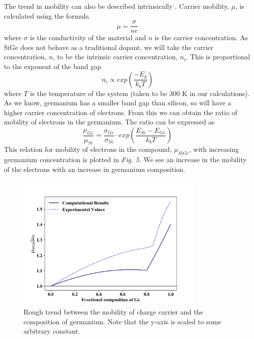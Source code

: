 \documentclass[10pt, twocolumn]{revtex4}    %
\begin{document}
The trend in mobility can also be described intrinsically \cite{ref01}. Carrier mobility, $\mu$, is calculated using the formula
\begin{equation}
\mu = \frac{\sigma}{n e}
\end{equation}
where $\sigma$ is the conductivity of the material and $n$ is the carrier concentration. As SiGe does not behave as a traditional dopant, we will take the carrier concentration, $n$, to be the intrinsic carrier concentration, $n_i$. This is proportional to the exponent of the band gap
\begin{equation}
n_i \propto exp\left(\frac{-E_g}{k_b T}\right)
\end{equation}
where $T$ is the temperature of the system (taken to be 300 K in our calculations). As we know, germanium has a smaller band gap than silicon, so will have a higher carrier concentration of electrons. From this we can obtain the ratio of mobility of electrons in the germanium. The ratio can be expressed as
\begin{equation}
\frac{\mu_{Ge}}{\mu_{Si}} = \frac{\sigma_{Ge}}{\sigma_{Si}}\cdot exp\left(\frac{E_{Si}-E_{Ge}}{k_b T}\right)
\end{equation}
This relation for mobility of electrons in the compound, $\mu_{SiGe}$, with increasing germanium concentration is plotted in \textit{Fig. 5.} We see an increase in the mobility of the electrons with an increase in germanium composition.

\begin{figure}[h!]
 \hspace*{-0.5cm}
  \includegraphics[width=260pt,height=190pt]{ugh.png}

    \caption{Rough trend between the mobility of charge carrier and the composition of germanium.  Note that the y-axis is scaled to some arbitrary constant.}
\end{figure}
\end{document}
